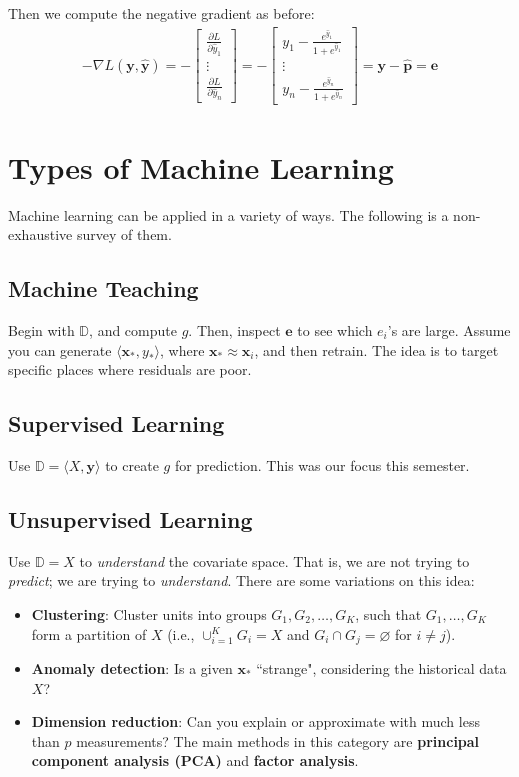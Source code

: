 \documentclass[12pt, a4paper]{article}
\theoremstyle{definition}
\begin{document}
	Then we compute the negative gradient as before:
	\begin{align*}
		-\nabla L(\bm{y}, \hat{\bm{y}})
		= -\begin{bmatrix}
			\frac{\partial L}{\partial \hat{y}_1}\\
			\vdots\\
			\frac{\partial L}{\partial \hat{y}_n}
		\end{bmatrix}
		= -\begin{bmatrix}
			y_1 - \frac{e^{\hat{y}_1}}{1 + e^{\hat{y}_1}}\\
			\vdots\\
			y_n - \frac{e^{\hat{y}_n}}{1 + e^{\hat{y}_n}}
		\end{bmatrix}
		=\bm{y} - \hat{\bm{p}}
		=\bm{e}
	\end{align*}
	\section{Types of Machine Learning}
	Machine learning can be applied in a variety of ways. The following
	is a non-exhaustive survey of them.
	\subsection*{Machine Teaching}
	Begin with $\mathbb{D}$, and compute $g$. Then, inspect $\bm{e}$ 
	to see which $e_i$'s are large. Assume you can generate
	$\langle \bm{x}_*, y_*\rangle$, where $\bm{x}_* \approx \bm{x}_i$,
	and then retrain. The idea is to target specific places where residuals
	are poor.
	\subsection*{Supervised Learning}
	Use $\mathbb{D} = \langle X, \bm{y}\rangle$ to create $g$ for prediction.
	This was our focus this semester.
	\subsection*{Unsupervised Learning}
	Use $\mathbb{D} = X$ to \textit{understand} the covariate space. That is,
	we are not trying to \textit{predict}; we are trying to \textit{understand}.
	There are some variations on this idea:
	\begin{itemize}
		\item \textbf{Clustering}: Cluster units into groups $G_1,G_2,\ldots,G_K$,
		such that $G_1,\ldots,G_K$ form a partition of $X$
		(i.e., $\cup_{i=1}^{K}G_i = X$ and $G_i\cap G_j =\varnothing$ for $i\neq j$).
		\item \textbf{Anomaly detection}: Is a given $\bm{x}_*$ ``strange",
		considering the historical data $X$?
		\item \textbf{Dimension reduction}: Can you explain or approximate with
		much less than $p$ measurements? The main methods in this category are
		\textbf{principal component analysis (PCA)} and \textbf{factor analysis}.
	\end{itemize}
\end{document}
